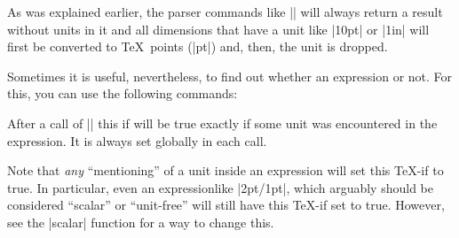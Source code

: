As was explained earlier, the parser commands like |\pgfmathparse|
will always return a result without units in it and all dimensions
that have a unit like |10pt| or |1in| will first be converted to \TeX\
points (|pt|) and, then, the unit is dropped.

Sometimes it is useful, nevertheless, to find out whether an
expression or not. For this, you can use the following commands:

{\let\ifpgfmathunitsdeclared\relax
  \begin{command}{\ifpgfmathunitsdeclared}
    After a call  of |\pgfmathparse| this if will be true exactly if
    some unit was encountered in the expression. It is always set
    globally in each call.
    
    Note that \emph{any} ``mentioning'' of a unit inside an
    expression will set this \TeX-if to true. In particular, even an
    expressionlike |2pt/1pt|, which arguably should be considered
    ``scalar'' or ``unit-free'' will still have this \TeX-if set to
    true. However, see the |scalar| function for a way to change
    this. 
  \end{command}
}

